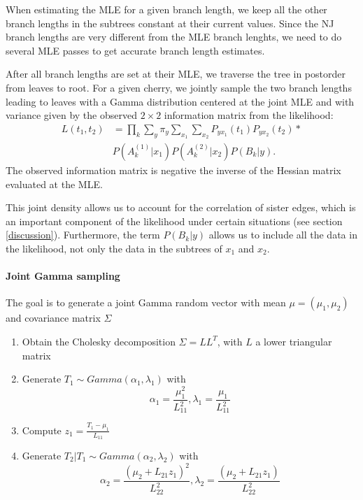 \documentclass[useAMS,usenatbib]{biom}
\begin{document}
When estimating the MLE for a given branch length, we keep all the
other branch lengths in the subtrees constant at their current
values. Since the NJ branch lengths are very different from the MLE
branch lenghts, we need to do several MLE passes to get accurate
branch length estimates.

After all branch lengths are set at their MLE, we traverse the tree in
postorder from leaves to root. For a given cherry, we jointly sample
the two branch lengths leading to leaves with a Gamma distribution
centered at the joint MLE and with variance given by the observed $2
\times 2$ information matrix from the likelihood:
\begin{eqnarray*}
L(t_1,t_2) &= \prod_k \sum_y \pi_y \sum_{x_1} \sum_{x_2}
P_{yx_1}(t_1)P_{yx_2}(t_2) * \\
&P(A^{(1)}_k|x_1)P(A^{(2)}_k|x_2)P(B_k|y).
\end{eqnarray*}
The observed information matrix is negative the inverse of the Hessian
matrix evaluated at the MLE.

This joint density allows us to account for the correlation of
sister edges, which is an important component of the likelihood under
certain situations (see section \ref{discussion}). Furthermore, the
term $P(B_k|y)$ allows us to include all the data in the likelihood,
not only the data in the subtrees of $x_1$ and $x_2$.

\paragraph{Joint Gamma sampling} The goal is to generate a joint Gamma
random vector with mean $\mu=(\mu_1, \mu_2)$ and covariance matrix
$\Sigma$
\begin{enumerate}
\item{Obtain the Cholesky decomposition $\Sigma=LL^T$, with $L$ a
    lower triangular matrix}
\item{Generate $T_1 \sim Gamma(\alpha_1, \lambda_1)$ with
\begin{equation}
\alpha_1 = \frac{\mu_1^2}{L_{11}^2},  \lambda_1 = \frac{\mu_1}{L_{11}^2}
\end{equation}}
\item{Compute $z_1 = \frac{T_1-\mu_1}{L_{11}}$}
\vspace{0.25cm}
\item{Generate $T_2|T_1 \sim Gamma(\alpha_2, \lambda_2)$ with
\begin{equation}
\alpha_2 = \frac{(\mu_2+L_{21}z_1)^2}{L_{22}^2}, \lambda_2 = \frac{(\mu_2+L_{21}z_1)}{L_{22}^2}
\end{equation}}
\end{enumerate}
\end{document}
